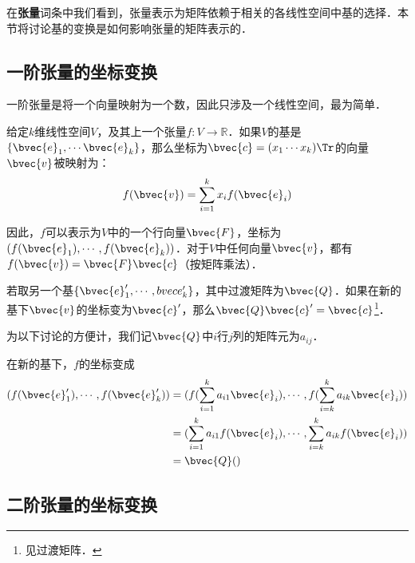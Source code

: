 

在\textbf{张量}词条中我们看到，张量表示为矩阵依赖于相关的各线性空间中基的选择．本节将讨论基的变换是如何影响张量的矩阵表示的．

\subsection{一阶张量的坐标变换}
一阶张量是将一个向量映射为一个数，因此只涉及一个线性空间，最为简单．

给定$k$维线性空间$V$，及其上一个张量$f:V\rightarrow\mathbb{R}$．如果$V$的基是$\{\bvec{e}_1, \cdots\bvec{e}_k\}$，那么坐标为$\bvec{c}=(x_1\cdots x_k)\Tr$的向量$\bvec{v}$被映射为：
\begin{equation}
f(\bvec{v})=\sum\limits_{i=1}^k x_if(\bvec{e}_i)
\end{equation}

因此，$f$可以表示为$V$中的一个行向量$\bvec{F}$，坐标为$(f(\bvec{e}_1), \cdots, f(\bvec{e}_k))$．对于$V$中任何向量$\bvec{v}$，都有$f(\bvec{v})=\bvec{F}\bvec{c}$（按矩阵乘法）．

若取另一个基$\{\bvec{e}_1', \cdots, \\bvec{e}_k'\}$，其中过渡矩阵为$\bvec{Q}$．如果在新的基下$\bvec{v}$的坐标变为$\bvec{c}'$，那么$\bvec{Q}\bvec{c}'=\bvec{c}$\footnote{见过渡矩阵．}．

为以下讨论的方便计，我们记$\bvec{Q}$中$i$行$j$列的矩阵元为$a_{ij}$．

在新的基下，$f$的坐标变成
\begin{equation}
\begin{aligned}
(f(\bvec{e}_1'), \cdots, f(\bvec{e}_k'))&=(f(\sum\limits^k_{i=1}a_{i1}\bvec{e}_i), \cdots, f(\sum\limits^k_{i=k}a_{ik}\bvec{e}_i))\\&=(\sum\limits^k_{i=1}a_{i1}f(\bvec{e}_i), \cdots, \sum\limits^k_{i=k}a_{ik}f(\bvec{e}_i))\\&=\bvec{Q}()
\end{aligned}
\end{equation}




\subsection{二阶张量的坐标变换}









